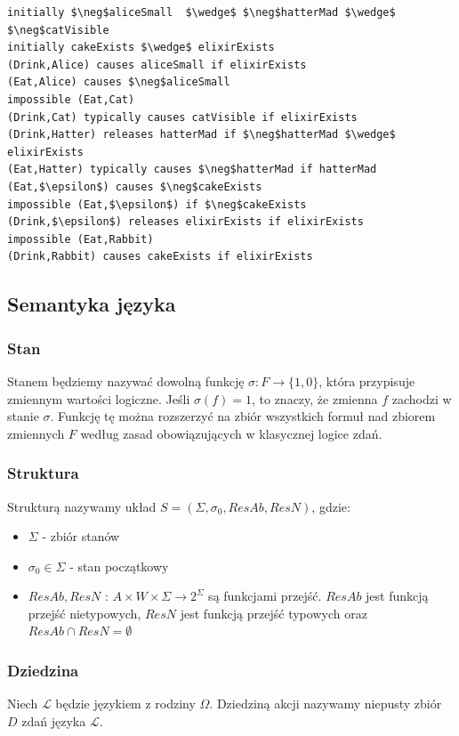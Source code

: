 \documentclass{article}
\begin{document}
\bigskip
{}
\begin{lstlisting}[mathescape=true, breaklines=true]
initially $\neg$aliceSmall  $\wedge$ $\neg$hatterMad $\wedge$ $\neg$catVisible
initially cakeExists $\wedge$ elixirExists
(Drink,Alice) causes aliceSmall if elixirExists
(Eat,Alice) causes $\neg$aliceSmall
impossible (Eat,Cat)
(Drink,Cat) typically causes catVisible if elixirExists
(Drink,Hatter) releases hatterMad if $\neg$hatterMad $\wedge$ elixirExists
(Eat,Hatter) typically causes $\neg$hatterMad if hatterMad
(Eat,$\epsilon$) causes $\neg$cakeExists
impossible (Eat,$\epsilon$) if $\neg$cakeExists
(Drink,$\epsilon$) releases elixirExists if elixirExists
impossible (Eat,Rabbit)
(Drink,Rabbit) causes cakeExists if elixirExists
\end{lstlisting}

\subsection{Semantyka języka} 

\subsubsection{Stan}
Stanem będziemy nazywać dowolną funkcję $\sigma:F\to \{1,0\}$, która przypisuje zmiennym wartości logiczne. Jeśli $\sigma(f)=1$, to znaczy, że zmienna $f$ zachodzi w stanie $\sigma$. Funkcję tę można rozszerzyć na zbiór wszystkich formuł nad zbiorem zmiennych $F$ według zasad obowiązujących w klasycznej logice zdań.

\subsubsection{Struktura}
Strukturą nazywamy układ $S=(\Sigma, \sigma_{0}, ResAb, ResN)$, gdzie:
\begin{itemize}
\item $\Sigma$ - zbiór stanów
\item $\sigma_{0} \in \Sigma$ - stan początkowy
\item $ResAb, ResN$ : $A\times W \times \Sigma \to 2^{\Sigma}$ są funkcjami przejść. $ResAb$ jest funkcją przejść nietypowych, $ResN$ jest funkcją przejść typowych oraz $ResAb \cap ResN= \emptyset$ 
\end{itemize}

\subsubsection{Dziedzina}
Niech $\mathcal{L}$ będzie językiem z rodziny $\Omega$. Dziedziną akcji nazywamy niepusty zbiór $D$ zdań języka $\mathcal{L}$.
\end{document}
